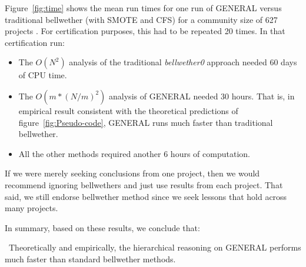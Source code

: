 \documentclass[10pt,journal,compsoc]{IEEEtran}
\newcommand{\fig}[1]{Figure~\ref{fig:#1}}
\newcommand{\bi}{\begin{itemize}}
\newcommand{\ei}{\end{itemize}}
\newenvironment{RQ}[1]%
{\noindent\begin{minipage}[c]{\linewidth}%
\begin{bclogo}[couleur=gray!20,%
                arrondi=0.1,logo=\bctrombone,%
                ombre=true%
                ]{{\small  ~#1}}}%
{\end{bclogo}\vspace{2mm}\end{minipage}}
\begin{document}
\fig{time} shows the mean run times for one run of GENERAL versus traditional bellwether (with SMOTE and CFS) for a community size of 627 projects . For certification purposes, this had to be repeated 20 times. In that certification run:

\bi
\item
The $O(N^2)$ analysis of the traditional {\em bellwether0} approach needed 60 days of CPU time.
\item 
The $O(m*(N/m)^2)$ analysis
of GENERAL needed 30  hours. That is, in empirical result consistent with the theoretical predictions of figure~\ref{fig:Pseudo-code}, GENERAL runs much faster than traditional bellwether.
\item 
All the other methods required another 6 hours of computation. 
\ei

If we were merely seeking conclusions from one project, then we would recommend ignoring bellwethers and just use results from each project. That said, we still endorse bellwether method since  we seek lessons that hold across many projects.

In summary, based on these results, we conclude that:


\begin{RQ}{Theoretically and empirically, the  hierarchical reasoning on GENERAL performs much faster than standard bellwether methods.}
\end{RQ}
\end{document}
